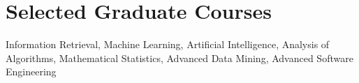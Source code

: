 
\section{Selected Graduate Courses}
Information Retrieval, Machine Learning, Artificial Intelligence, Analysis of Algorithms, Mathematical Statistics, Advanced Data Mining, Advanced Software Engineering
